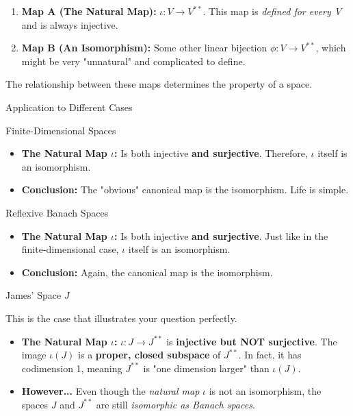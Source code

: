 \documentclass[aps,preprint]{revtex4}
\newenvironment{answer}
  {\begin{tcolorbox}[colback=green!5!white,colframe=green!75!black,title=Answer]}
  {\end{tcolorbox}}
\begin{document}
\begin{answer}
\begin{enumerate}
\item \textbf{Map A (The Natural Map):} $\iota: V \to V^{**}$. This map is 
\textit{defined for every V} and is always injective.

\item \textbf{Map B (An Isomorphism):} Some other linear bijection $\phi: V
\to V^{**}$, which might be very "unnatural" and complicated to define.
\end{enumerate}

The relationship between these maps determines the property of a space.

Application to Different Cases

Finite-Dimensional Spaces

\begin{itemize}
\item \textbf{The Natural Map $\iota$:} Is both injective \textbf{and
surjective}. Therefore, $\iota$ itself is an isomorphism.

\item \textbf{Conclusion:} The "obvious" canonical map is the isomorphism.
Life is simple.
\end{itemize}

Reflexive Banach Spaces

\begin{itemize}
\item \textbf{The Natural Map $\iota$:} Is both injective \textbf{and
surjective}. Just like in the finite-dimensional case, $\iota$ itself is an
isomorphism.

\item \textbf{Conclusion:} Again, the canonical map is the isomorphism.
\end{itemize}

James' Space $J$

This is the case that illustrates your question perfectly.

\begin{itemize}
\item \textbf{The Natural Map $\iota$:} $\iota: J \to J^{**}$ is \textbf{%
injective but NOT surjective}. The image $\iota(J)$ is a \textbf{proper,
closed subspace} of $J^{**}$. In fact, it has codimension 1, meaning $J^{**}$
is "one dimension larger" than $\iota(J)$.

\item \textbf{However...} Even though the \textit{natural map} $\iota$ is
not an isomorphism, the spaces $J$ and $J^{**}$ are still \textit{isomorphic
as Banach spaces}.


\end{itemize}
\end{answer}
\end{document}
